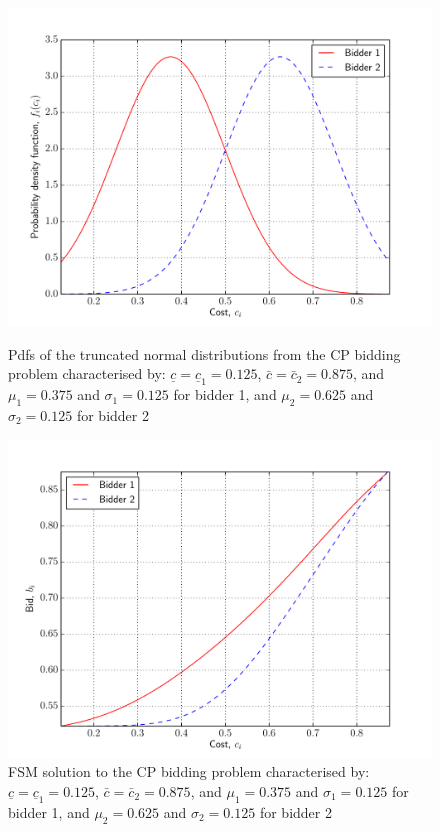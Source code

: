 \begin{figure}[p!]
  \includegraphics[width=\figsize]{Approximation/Figures/test_truncated_normal_pdfs}
  \caption{Pdfs of the truncated normal distributions from the CP bidding problem characterised by: $\underline{c}=\underline{c}_1=0.125$, $\bar{c}=\bar{c}_2=0.875$, and $\mu_1=0.375$ and $\sigma_1=0.125$ for bidder 1, and $\mu_2=0.625$ and $\sigma_2=0.125$ for bidder 2}
  \label{fig:test_truncated_normal_pdfs_approximation}
  \vspace{10mm}
  \includegraphics[width=\figsize]{Approximation/Figures/test_truncated_normal_bids}
  \caption{FSM solution to the CP bidding problem characterised by: $\underline{c}=\underline{c}_1=0.125$, $\bar{c}=\bar{c}_2=0.875$, and $\mu_1=0.375$ and $\sigma_1=0.125$ for bidder 1, and $\mu_2=0.625$ and $\sigma_2=0.125$ for bidder 2}
  \label{fig:test_truncated_normal_bids_approximation}
\end{figure}

